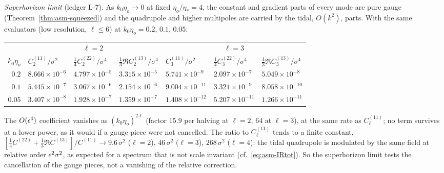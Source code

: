 \emph{Superhorizon limit} (ledger L-7).  As $k_0\eta_o\to0$ at fixed $\eta_o/\eta_*=4$, the constant and gradient parts of every mode are pure gauge
(Theorem~\ref{thm:asm-squeezed}) and the quadrupole and higher multipoles are carried by the tidal, $O(k^2)$, parts.  With the same evaluators (low
resolution, $\ell\le6$) at $k_0\eta_o=0.2,\,0.1,\,0.05$:
\begin{center}\footnotesize
\begin{tabular}{r|lll|lll}
\hline
& \multicolumn{3}{c|}{$\ell=2$} & \multicolumn{3}{c}{$\ell=3$}\\
$k_0\eta_o$ & $C^{(11)}_2/\sigma^2$ & $\tfrac14C^{(22)}_2/\sigma^4$ & $\tfrac13\Re C^{(13)}_2/\sigma^4$ & $C^{(11)}_3/\sigma^2$ & $\tfrac14C^{(22)}_3/\sigma^4$ & $\tfrac13\Re C^{(13)}_3/\sigma^4$\\ \hline
$0.2$  & $8.666\times10^{-6}$ & $4.797\times10^{-5}$ & $3.315\times10^{-5}$ & $5.741\times10^{-9}$ & $2.097\times10^{-7}$ & $5.049\times10^{-8}$\\
$0.1$  & $5.445\times10^{-7}$ & $3.067\times10^{-6}$ & $2.154\times10^{-6}$ & $9.004\times10^{-11}$ & $3.321\times10^{-9}$ & $8.058\times10^{-10}$\\
$0.05$ & $3.407\times10^{-8}$ & $1.928\times10^{-7}$ & $1.359\times10^{-7}$ & $1.408\times10^{-12}$ & $5.207\times10^{-11}$ & $1.266\times10^{-11}$\\ \hline
\end{tabular}
\end{center}
The $O(\epsilon^4)$ coefficient vanishes as $(k_0\eta_o)^{2\ell}$ (factor $15.9$ per halving at $\ell=2$, $64$ at $\ell=3$), at the same rate as
$C^{(11)}_\ell$; no term survives at a lower power, as it would if a gauge piece were not cancelled.  The ratio to $C^{(11)}_\ell$ tends to a finite
constant, $[\tfrac14C^{(22)}+\tfrac13\Re C^{(13)}]/C^{(11)}\to9.6\,\sigma^2$ ($\ell=2$), $46\,\sigma^2$ ($\ell=3$), $268\,\sigma^2$ ($\ell=4$): the tidal
quadrupole is modulated by the same field at relative order $\epsilon^2\sigma^2$, as expected for a spectrum that is not scale invariant (cf.\
\eqref{eq:asm-IRtot}).  So the superhorizon limit tests the cancellation of the gauge pieces, not a vanishing of the relative correction.

